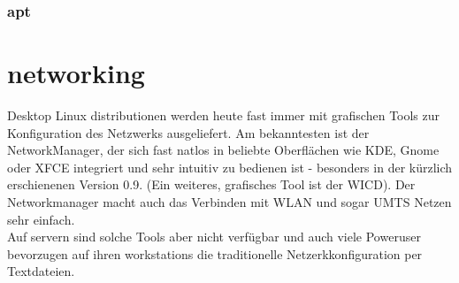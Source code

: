 \documentclass[10pt,paper=a4,final]{scrartcl}
\begin{document}
\subsubsection{apt}

\section{networking}
Desktop Linux distributionen werden heute fast immer mit grafischen Tools zur Konfiguration des Netzwerks ausgeliefert. Am bekanntesten ist der NetworkManager, der sich fast natlos in beliebte Oberfl\"achen wie KDE, Gnome oder XFCE integriert und sehr intuitiv zu bedienen ist - besonders in der k\"urzlich erschienenen Version 0.9. (Ein weiteres, grafisches Tool ist der WICD). Der Networkmanager macht auch das Verbinden mit WLAN und sogar UMTS Netzen sehr einfach.\\
Auf servern sind solche Tools aber nicht verf\"ugbar und auch viele Poweruser bevorzugen auf ihren workstations die traditionelle Netzerkkonfiguration per Textdateien.\\
\end{document}
